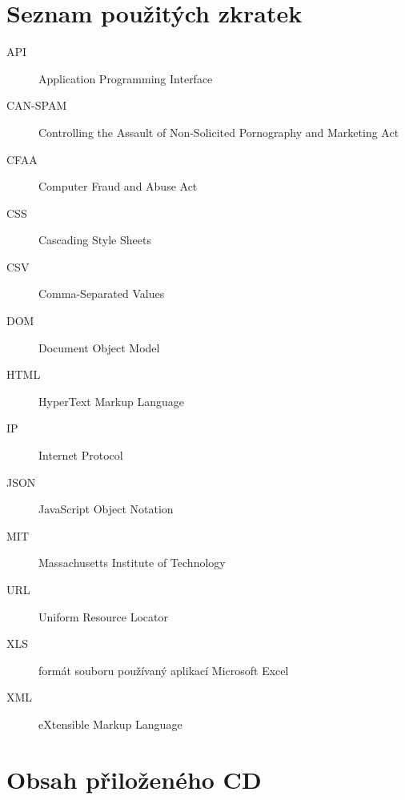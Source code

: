 \documentclass[thesis=B,czech]{FITthesis}[2012/06/26]
\begin{document}
\appendix




\chapter{Seznam použitých zkratek}
\begin{description}
	\item[API] Application Programming Interface
	\item[CAN-SPAM] Controlling the Assault of Non-Solicited Pornography and Marketing Act
	\item[CFAA] Computer Fraud and Abuse Act
	\item[CSS] Cascading Style Sheets
	\item[CSV] Comma-Separated Values
	\item[DOM] Document Object Model
	\item[HTML] HyperText Markup Language
	\item[IP] Internet Protocol
	\item[JSON] JavaScript Object Notation
	\item[MIT] Massachusetts Institute of Technology
	\item[URL] Uniform Resource Locator
	\item[XLS] formát souboru používaný aplikací Microsoft Excel
	\item[XML] eXtensible Markup Language
\end{description}


\chapter{Obsah přiloženého CD}

\begin{figure}
\end{figure}
\end{document}
